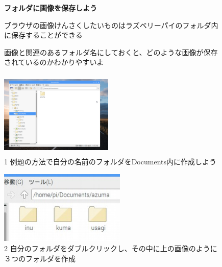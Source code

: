 \documentclass[a4paper,12pt]{jarticle}
\begin{document}
\begin{figure}[t]
  \flushleft
  {\bfseries
    フォルダに画像を保存しよう}

  ブラウザの画像けんさくしたいものはラズベリーパイのフォルダ内に保存することができる

  画像と関連のあるフォルダ名にしておくと、どのような画像が保存されているのかわかりやすいよ



  \begin{minipage}{\textwidth}
    \begin{minipage}{6.582cm}
      \includegraphics[width=5.401cm,height=4.152cm]{textbook-img093.png}\\
      1 例題の方法で自分の名前のフォルダをDocuments内に作成しよう
    \end{minipage}
    \begin{minipage}{3.582cm}
    \end{minipage}
    \begin{minipage}{6.582cm}
      \includegraphics[width=5.995cm,height=3.475cm]{textbook-img094.jpg}\\
      2 自分のフォルダをダブルクリックし、その中に上の画像のように３つのフォルダを作成
    \end{minipage}
  \end{minipage}



\end{figure}
\end{document}
